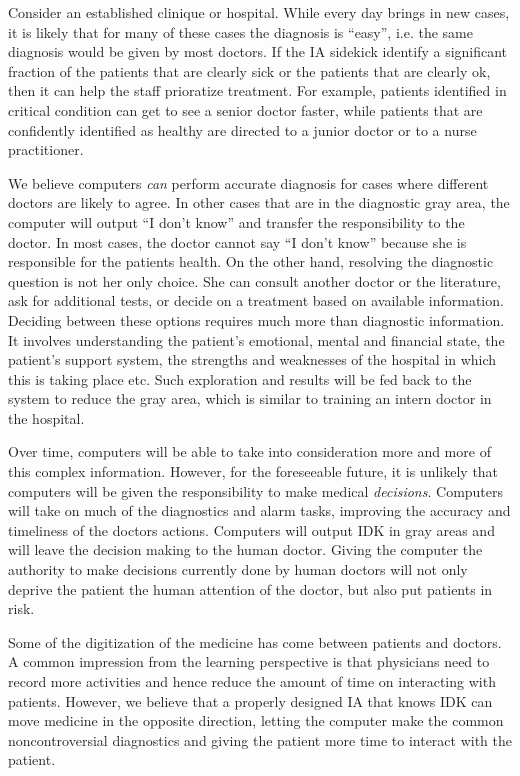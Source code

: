 \documentclass[11pt]{pnas-new}
\begin{document}
  Consider an established clinique or hospital. While every day brings
  in new cases, it is likely that for many of these cases the
  diagnosis is ``easy'', i.e. the same diagnosis would be given by
  most doctors. If the IA sidekick identify a significant fraction of
  the patients that are clearly sick or the patients that are clearly
  ok, then it can help the staff prioratize treatment. For example,
  patients identified in critical condition can get to see a senior
  doctor faster, while patients that are confidently identified as
  healthy are directed to a junior doctor or to a nurse practitioner.

  
  
  We believe computers {\em can} perform accurate diagnosis for cases where
  different doctors are likely to agree. In other cases {\color{blue}that are in the}
  diagnostic gray area, the computer will output ``I don't know'' and
  transfer the responsibility to the doctor. In most cases, the doctor
  cannot say ``I don't know'' because she is responsible for the
  patients health. On the other hand, resolving the diagnostic
  question is not her only choice. She can consult another doctor or
  the literature, ask for additional tests, or decide on a treatment
  based on available information. Deciding between these options requires much
  more than diagnostic information. It involves understanding the
  patient's emotional, mental and financial state, the patient's
  support system, the strengths and weaknesses of the hospital in
  which this is taking place etc. {\color{blue}Such exploration and results will be fed back to the system to reduce the gray area, which is similar to training an intern doctor in the hospital.}

  Over time, computers will be able to take into consideration more
  and more of this complex information. However, for the foreseeable
  future, it is unlikely that computers will be given the
  responsibility to make medical {\em decisions}. Computers
  will take on much of the diagnostics and alarm tasks, improving the
  accuracy and timeliness of the doctors actions. Computers will
  output IDK in gray areas and will leave the decision making to the
  human doctor. Giving the computer the authority to make decisions
  currently done by human doctors will {\color{blue}not only} deprive the patient the human
  attention of the doctor{\color{blue}, but also put patients in risk}.

  Some of the digitization of the medicine has come between patients
  and doctors. {\color{blue}A common impression from the learning perspective is that physicians need to record more activities and hence reduce the amount of time on interacting with patients. However, we} %
  believe that {\color{blue}a properly designed } IA {\color{blue}that knows IDK} can
  move medicine in the opposite direction, letting the computer make
  the common noncontroversial diagnostics and giving the patient more
  time to interact with the patient.
\end{document}
